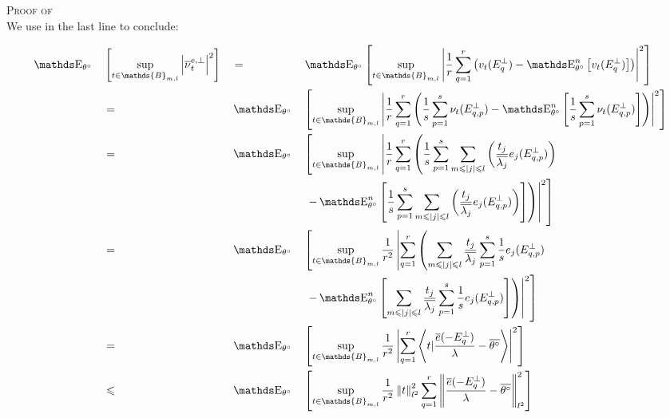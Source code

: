 \begin{pro}{\textsc{Proof of }\\}
We use  in the last line to conclude:

\begin{alignat*}{4}
& \E_{\theta^{\circ}}&&\left[\sup\limits_{t \in \mathds{B}_{m,l}} \left\vert \overline{\nu}^{e, \perp}_{t}\right\vert^{2}\right] && = && \E_{\theta^{\circ}}\left[\sup\limits_{t \in \mathds{B}_{m,l}} \left\vert \frac{1}{r} \sum\limits_{q = 1}^{r} \left(v_{t}(E^{\perp}_{q}) - \E_{\theta^{\circ}}^{n}\left[v_{t}(E^{\perp}_{q})\right]\right)\right\vert^{2}\right]\\
& && = && \E_{\theta^{\circ}}&&\left[\sup\limits_{t \in \mathds{B}_{m,l}} \left\vert \frac{1}{r} \sum\limits_{q = 1}^{r} \left(\frac{1}{s} \sum\limits_{p = 1}^{s} \nu_{t}(E^{\perp}_{q, p}) - \E_{\theta^{\circ}}^{n}\left[\frac{1}{s} \sum\limits_{p = 1}^{s} \nu_{t}(E^{\perp}_{q, p})\right]\right)\right\vert^{2}\right]\\
& && = && \E_{\theta^{\circ}}&&\left[\sup\limits_{t \in \mathds{B}_{m,l}} \left\vert \frac{1}{r} \sum\limits_{q = 1}^{r} \left(\frac{1}{s} \sum\limits_{p = 1}^{s} \sum\limits_{m \leq \vert j \vert \leq l} \left(\frac{t_{j}}{\overline{\lambda_{j}}} e_{j}(E^{\perp}_{q, p})\right) \right.\right.\right. \\
& && && && \left.\left.\left.- \E_{\theta^{\circ}}^{n}\left[\frac{1}{s} \sum\limits_{p = 1}^{s} \sum\limits_{m \leq \vert j \vert \leq l} \left(\frac{t_{j}}{\overline{\lambda_{j}}} e_{j}(E^{\perp}_{q, p})\right)\right]\right)\right\vert^{2}\right]\\
& && = && \E_{\theta^{\circ}}&&\left[\sup\limits_{t \in \mathds{B}_{m,l}} \frac{1}{r^{2}}\left\vert \sum\limits_{q = 1}^{r} \left( \sum\limits_{m \leq \vert j \vert \leq l}\frac{t_{j}}{\overline{\lambda_{j}}} \sum\limits_{p = 1}^{s}\frac{1}{s} e_{j}(E^{\perp}_{q, p}) \right.\right.\right. \\
& && && && \left.\left.\left.- \E_{\theta^{\circ}}^{n}\left[ \sum\limits_{m \leq \vert j \vert \leq l} \frac{t_{j}}{\overline{\lambda_{j}}} \sum\limits_{p = 1}^{s} \frac{1}{s} e_{j}(E^{\perp}_{q, p})\right]\right)\right\vert^{2}\right]\\
& && = && \E_{\theta^{\circ}}&&\left[\sup\limits_{t \in \mathds{B}_{m,l}} \frac{1}{r^{2}}\left\vert \sum\limits_{q = 1}^{r} \left\langle t \vert \frac{\overline{e}(-E^{\perp}_{q})}{\lambda} - \overline{\theta^{\circ}} \right\rangle \right\vert^{2}\right]\\
& && \leq && \E_{\theta^{\circ}}&&\left[\sup\limits_{t \in \mathds{B}_{m,l}} \frac{1}{r^{2}}\left\Vert t \right\Vert_{l^{2}}^{2} \sum\limits_{q = 1}^{r} \left\Vert \frac{\overline{e}(-E^{\perp}_{q})}{\lambda} - \overline{\theta^{\circ}} \right\Vert_{l^{2}}^{2}\right]\\

\end{alignat*}
\end{pro}
